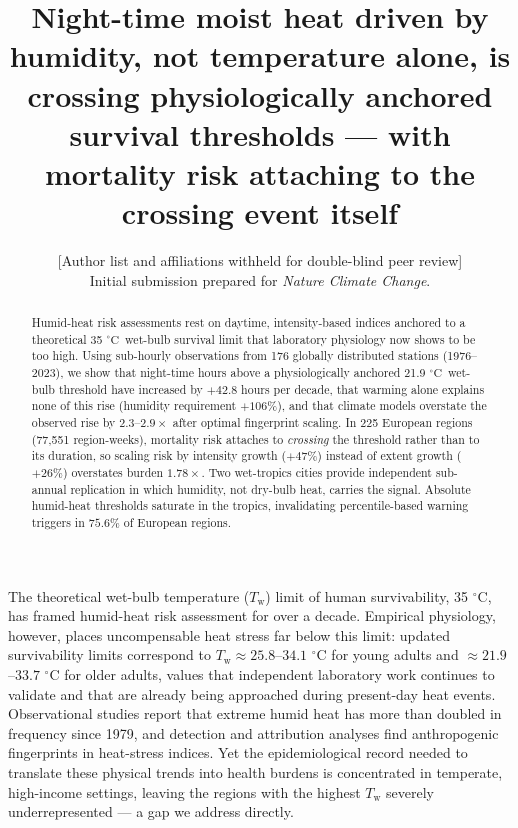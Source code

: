 \documentclass[12pt,a4paper]{article}
\title{\textbf{Night-time moist heat driven by humidity, not temperature alone, is crossing
physiologically anchored survival thresholds --- with mortality risk attaching to the crossing
event itself}}
\author{[Author list and affiliations withheld for double-blind peer review]\\[4pt]
\small Initial submission prepared for \textit{Nature Climate Change}.}
\date{}
\newcommand{\dd}{\ensuremath{\,^{\circ}\mathrm{C}}}
\begin{document}
\maketitle

\begin{abstract}
\noindent Humid-heat risk assessments rest on daytime, intensity-based indices anchored to a
theoretical 35\,\dd~wet-bulb survival limit that laboratory physiology now shows to be too high.
Using sub-hourly observations from 176 globally distributed stations (1976--2023), we show that
night-time hours above a physiologically anchored 21.9\,\dd~wet-bulb threshold have increased by
$+42.8$ hours per decade, that warming alone explains none of this rise (humidity requirement
$+106\%$), and that climate models overstate the observed rise by $2.3$--$2.9\times$ after optimal
fingerprint scaling. In 225 European regions (77,551 region-weeks), mortality risk attaches to
\emph{crossing} the threshold rather than to its duration, so scaling risk by intensity growth
($+47\%$) instead of extent growth ($+26\%$) overstates burden $1.78\times$. Two wet-tropics
cities provide independent sub-annual replication in which humidity, not dry-bulb heat, carries
the signal. Absolute humid-heat thresholds saturate in the tropics, invalidating percentile-based
warning triggers in $75.6\%$ of European regions.
\end{abstract}

The theoretical wet-bulb temperature ($T_\mathrm{w}$) limit of human survivability, 35\,\dd, has
framed humid-heat risk assessment for over a decade\citep{SherwoodHuber2010}. Empirical physiology,
however, places uncompensable heat stress far below this limit: updated survivability limits
correspond to $T_\mathrm{w}\!\approx\!25.8$--$34.1\,\dd$ for young adults and
$\approx\!21.9$--$33.7\,\dd$ for older adults\citep{Vanos2023}, values that independent laboratory
work continues to validate\citep{Meade2025} and that are already being approached during present-day
heat events\citep{PerkinsKirkpatrick2026}. Observational studies report that extreme humid heat has
more than doubled in frequency since 1979\citep{Raymond2020}, and detection and attribution analyses
find anthropogenic fingerprints in heat-stress indices\citep{Knutson2016}. Yet the epidemiological
record needed to translate these physical trends into health burdens is concentrated in temperate,
high-income settings, leaving the regions with the highest $T_\mathrm{w}$ severely
underrepresented\citep{Sherwood2023} --- a gap we address directly.
\end{document}
